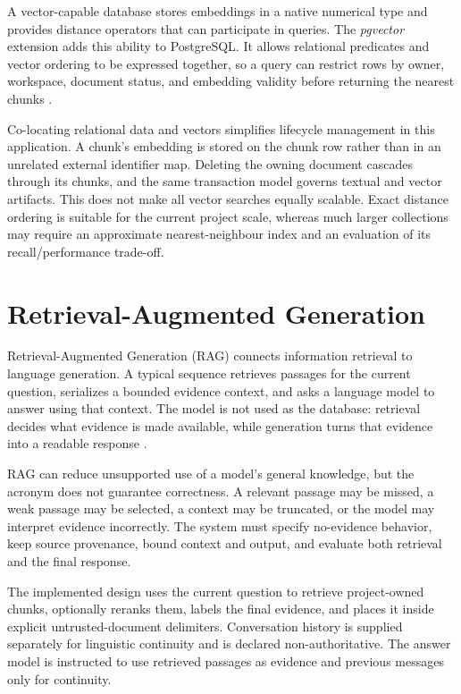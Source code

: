 A vector-capable database stores embeddings in a native numerical type and provides distance operators that can participate in queries. The \emph{pgvector} extension adds this ability to PostgreSQL. It allows relational predicates and vector ordering to be expressed together, so a query can restrict rows by owner, workspace, document status, and embedding validity before returning the nearest chunks \cite{PgvectorDocs}.

Co-locating relational data and vectors simplifies lifecycle management in this application. A chunk's embedding is stored on the chunk row rather than in an unrelated external identifier map. Deleting the owning document cascades through its chunks, and the same transaction model governs textual and vector artifacts. This does not make all vector searches equally scalable. Exact distance ordering is suitable for the current project scale, whereas much larger collections may require an approximate nearest-neighbour index and an evaluation of its recall/performance trade-off.

\section{Retrieval-Augmented Generation}
\label{sec:background-rag}

Retrieval-Augmented Generation (RAG) connects information retrieval to language generation. A typical sequence retrieves passages for the current question, serializes a bounded evidence context, and asks a language model to answer using that context. The model is not used as the database: retrieval decides what evidence is made available, while generation turns that evidence into a readable response \cite{Lewis2020RAG}.

RAG can reduce unsupported use of a model's general knowledge, but the acronym does not guarantee correctness. A relevant passage may be missed, a weak passage may be selected, a context may be truncated, or the model may interpret evidence incorrectly. The system must specify no-evidence behavior, keep source provenance, bound context and output, and evaluate both retrieval and the final response.

The implemented design uses the current question to retrieve project-owned chunks, optionally reranks them, labels the final evidence, and places it inside explicit untrusted-document delimiters. Conversation history is supplied separately for linguistic continuity and is declared non-authoritative. The answer model is instructed to use retrieved passages as evidence and previous messages only for continuity.

